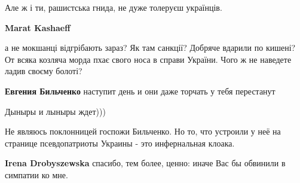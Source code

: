 \begin{itemize}
\begin{itemize}
Але ж і ти, рашистська гнида, не дуже толеруєш українців.

 
\textbf{Marat Kashaeff} 

а не мокшанці відгрібають зараз? Як там санкції? Добряче вдарили по кишені? От
всяка козляча морда пхає свого носа в справи України. Чого ж не наведете ладив
своєму болоті?


 
\textbf{Евгения Бильченко} наступит день и они даже торчать у тебя перестанут🤣🤣🤣🤣🤣🤣🤣🤣🤣
\end{itemize}

 
Дыныры и лыныры ждет)))

 
Не являюсь поклонницей госпожи Бильченко. Но то, что устроили у неё на странице псевдопатриоты Украины - это инфернальная клоака.

\begin{itemize}
 
\textbf{Irena Drobyszewska} спасибо, тем более, ценно: иначе Вас бы обвинили в симпатии ко мне.

 

\end{itemize}
\end{itemize}
